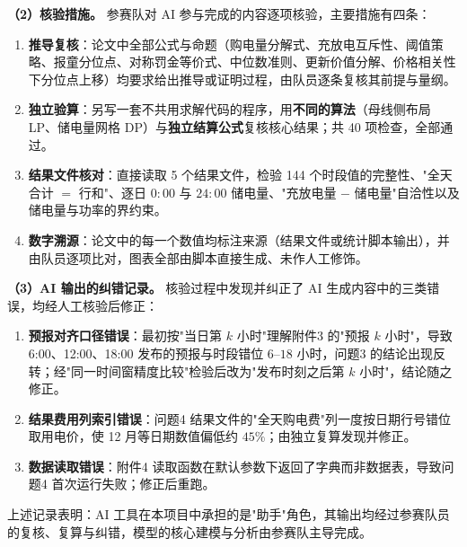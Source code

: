 \documentclass[12pt,a4paper]{ctexart}
\begin{document}
\textbf{（2）核验措施。} 参赛队对 AI 参与完成的内容逐项核验，主要措施有四条：

\begin{enumerate}[label=(\arabic*),leftmargin=2.2em,itemsep=2pt]
  \item \textbf{推导复核}：论文中全部公式与命题（购电量分解式、充放电互斥性、阈值策略、报童分位点、对称罚金等价式、中位数准则、更新价值分解、价格相关性下分位点上移）均要求给出推导或证明过程，由队员逐条复核其前提与量纲。
  \item \textbf{独立验算}：另写一套不共用求解代码的程序，用\textbf{不同的算法}（母线侧布局 LP、储电量网格 DP）与\textbf{独立结算公式}复核核心结果；共 40 项检查，全部通过。
  \item \textbf{结果文件核对}：直接读取 5 个结果文件，检验 144 个时段值的完整性、"全天合计 $=$ 行和"、逐日 $0:00$ 与 $24:00$ 储电量、"充放电量 $-$ 储电量"自洽性以及储电量与功率的界约束。
  \item \textbf{数字溯源}：论文中的每一个数值均标注来源（结果文件或统计脚本输出），并由队员逐项比对，图表全部由脚本直接生成、未作人工修饰。
\end{enumerate}

\textbf{（3）AI 输出的纠错记录。} 核验过程中发现并纠正了 AI 生成内容中的三类错误，均经人工核验后修正：

\begin{enumerate}[label=(\roman*),leftmargin=2.4em,itemsep=2pt]
  \item \textbf{预报对齐口径错误}：最初按"当日第 $k$ 小时"理解附件3 的"预报 $k$ 小时"，导致 6:00、12:00、18:00 发布的预报与时段错位 $6$--$18$ 小时，问题3 的结论出现反转；经"同一时间窗精度比较"检验后改为"发布时刻之后第 $k$ 小时"，结论随之修正。
  \item \textbf{结果费用列索引错误}：问题4 结果文件的"全天购电费"列一度按日期行号错位取用电价，使 12 月等日期数值偏低约 $45\%$；由独立复算发现并修正。
  \item \textbf{数据读取错误}：附件4 读取函数在默认参数下返回了字典而非数据表，导致问题4 首次运行失败；修正后重跑。
\end{enumerate}

上述记录表明：AI 工具在本项目中承担的是"助手"角色，其输出均经过参赛队员的复核、复算与纠错，模型的核心建模与分析由参赛队主导完成。
\end{document}

